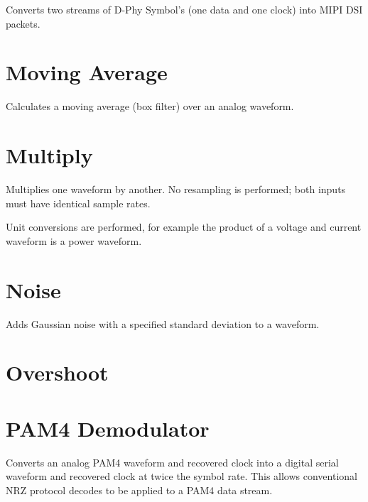 Converts two streams of D-Phy Symbol's (one data and one clock) into MIPI DSI packets.

\pagebreak
\section{Moving Average}

Calculates a moving average (box filter) over an analog waveform.

\pagebreak
\section{Multiply}

Multiplies one waveform by another. No resampling is performed; both inputs must have identical sample rates.

Unit conversions are performed, for example the product of a voltage and current waveform is a power waveform.

\pagebreak
\section{Noise}

Adds Gaussian noise with a specified standard deviation to a waveform.

\pagebreak
\section{Overshoot}

\pagebreak
\section{PAM4 Demodulator}

Converts an analog PAM4 waveform and recovered clock into a digital serial waveform and recovered clock at twice the
symbol rate. This allows conventional NRZ protocol decodes to be applied to a PAM4 data stream.

